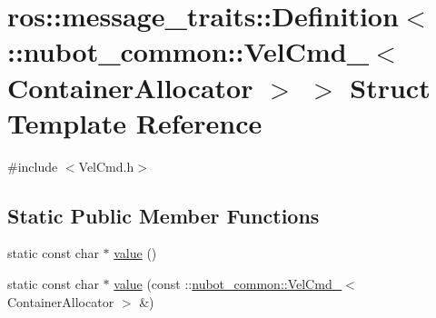 \hypertarget{structros_1_1message__traits_1_1Definition_3_01_1_1nubot__common_1_1VelCmd___3_01ContainerAllocator_01_4_01_4}{\section{ros\-:\-:message\-\_\-traits\-:\-:Definition$<$ \-:\-:nubot\-\_\-common\-:\-:Vel\-Cmd\-\_\-$<$ Container\-Allocator $>$ $>$ Struct Template Reference}
\label{structros_1_1message__traits_1_1Definition_3_01_1_1nubot__common_1_1VelCmd___3_01ContainerAllocator_01_4_01_4}
}


{\ttfamily \#include $<$Vel\-Cmd.\-h$>$}

\subsection*{Static Public Member Functions}
\begin{DoxyCompactItemize}
\item 
static const char $\ast$ \hyperlink{structros_1_1message__traits_1_1Definition_3_01_1_1nubot__common_1_1VelCmd___3_01ContainerAllocator_01_4_01_4_a25dc2aa592cdf96bad4734c875e7910a}{value} ()
\item 
static const char $\ast$ \hyperlink{structros_1_1message__traits_1_1Definition_3_01_1_1nubot__common_1_1VelCmd___3_01ContainerAllocator_01_4_01_4_a913a2b3f2ced22b67c3fdf1893ad3844}{value} (const \-::\hyperlink{structnubot__common_1_1VelCmd__}{nubot\-\_\-common\-::\-Vel\-Cmd\-\_\-}$<$ Container\-Allocator $>$ \&)
\end{DoxyCompactItemize}


